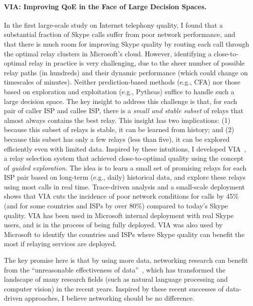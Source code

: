 \paragraph{VIA: Improving QoE in the Face of Large Decision Spaces.} 
In the first large-scale study on Internet telephony quality, I found that a substantial fraction of Skype calls suffer from poor network performance, and that there is much room for improving Skype quality by routing each call through the optimal relay clusters in Microsoft's cloud.
However, identifying a close-to-optimal relay in practice is very challenging, due to the sheer number of possible relay paths (in hundreds) and their dynamic performance (which could change on timescales of minutes). 
Neither prediction-based methods (e.g., CFA) nor those based on exploration and exploitation (e.g., Pytheas) suffice to handle such a large decision space.
The key insight to address this challenge is that, for each pair of caller ISP and callee ISP, there is a {\em small and stable subset} of relays that almost always contains the best relay. 
This insight has two implications: (1) because this subset of relays is stable, it can be learned from history; and (2) because this subset has only a few relays (less than five), it can be explored efficiently even with limited data.
Inspired by these intuitions, I developed {VIA}~\cite{via}, a relay selection system that achieved close-to-optimal quality using the concept of {\em guided exploration}. The idea is to learn a small set of promising relays for each ISP pair based on long-term (e.g., daily) historical data, and explore these relays using most calls in real time.
Trace-driven analysis and a small-scale deployment shows that VIA cuts the incidence of poor network conditions for calls by 45\% (and for some countries and ISPs by over 80\%) compared to today's Skype quality.
VIA has been used in Microsoft internal deployment with real Skype users, and is in the process of being fully deployed. 
VIA was also used by Microsoft to identify the countries and ISPs where Skype quality can benefit the most if relaying services are deployed.


The key promise here is that by using more data, networking research can 
benefit from the ``unreasonable effectiveness of data''~\cite{google-data}, 
which has transformed the landscape of many research fields 
(such as natural language processing and computer vision) in the recent years.
Inspired by these recent successes of data-driven approaches, 
I believe networking should be no difference. 

